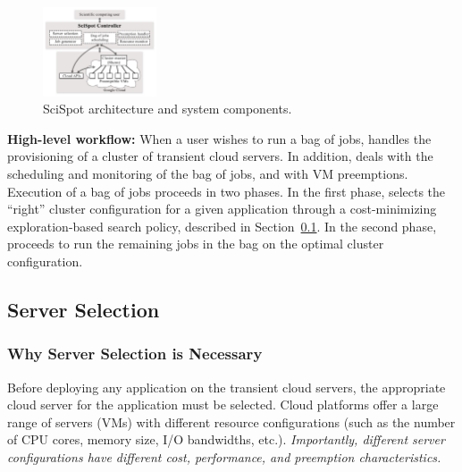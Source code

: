 \begin{figure}[t]
  \includegraphics[width=0.3\textwidth]{../figures/Architecture.png}
\vspace*{\myfigspace}
  \caption{SciSpot architecture and system components.}
  \label{fig:arch}
  \vspace*{\myfigspace}
\end{figure}


\noindent \textbf{High-level workflow:} When a user wishes to run a bag of jobs, \sysname handles the provisioning of a cluster of transient cloud servers.
In addition, \sysname deals with the scheduling and monitoring of the bag of jobs, and with VM preemptions. 
Execution of a bag of jobs proceeds in two phases.
In the first phase, \sysname selects the ``right'' cluster configuration for a given application through a cost-minimizing exploration-based search policy, described in Section~\ref{subsec:server-selection}. 
In the second phase, \sysname proceeds to run the remaining jobs in the bag on the optimal cluster configuration. 

\subsection{Server Selection}
\label{subsec:server-selection}

\subsubsection{Why Server Selection is Necessary}

Before deploying any application on the transient cloud servers, the appropriate cloud server for the application must be selected. 
Cloud platforms offer a large range of servers (VMs) with different resource configurations (such as the number of CPU cores, memory size, I/O bandwidths, etc.).  \emph{Importantly, different server configurations have different cost, performance, and preemption characteristics. }

